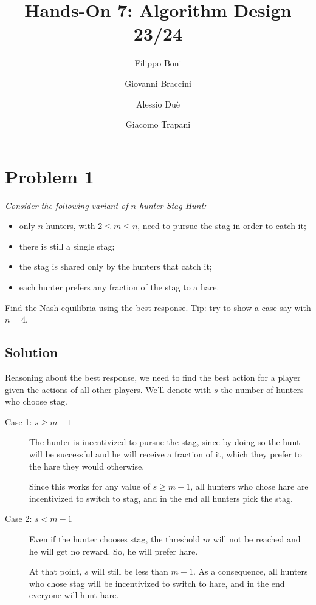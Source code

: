 \documentclass[a4paper, 12pt]{article}
\title{Hands-On 7: Algorithm Design 23/24}
\author{Filippo Boni \and Giovanni Braccini \and Alessio Duè \and Giacomo Trapani}
\begin{document}
\maketitle

\section{Problem 1}

{\itshape
  Consider the following variant of \(n\)-hunter Stag Hunt:
  \begin{itemize}
  \item only \(n\) hunters, with \(2 \leq m \leq n\), need to pursue the stag in order to catch it;
  \item there is still a single stag;
  \item the stag is shared only by the hunters that catch it;
  \item each hunter prefers any fraction of the stag to a hare.
  \end{itemize}

  Find the Nash equilibria using the best response. Tip: try to show a case say with \(n = 4\).}

\subsection{Solution}

Reasoning about the best response, we need to find the best action for a player given the actions of all other players. We'll denote with \(s\) the number of hunters who choose stag.
\begin{description}
\item[Case 1: \(s \geq m-1\)] The hunter is incentivized to pursue the stag, since by doing so the hunt will be successful and he will receive a fraction of it, which they prefer to the hare they would otherwise.

  Since this works for any value of \(s \geq m-1\), all hunters who chose hare are incentivized to switch to stag, and in the end all hunters pick the stag.

\item[Case 2: \(s < m-1\)] Even if the hunter chooses stag, the threshold \(m\) will not be reached and he will get no reward. So, he will prefer hare.

  At that point, \(s\) will still be less than \(m-1\). As a consequence, all hunters who chose stag will be incentivized to switch to hare, and in the end everyone will hunt hare.
\end{description}
\end{document}
